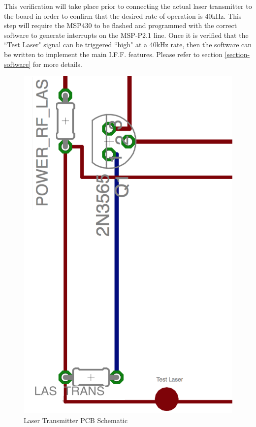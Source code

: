 \documentclass[letterpaper,10pt]{article}
\begin{document}
\begin{spacing}{1.15}
This verification will take place prior to connecting the actual laser transmitter to the board in order to confirm that the desired rate of operation is 40kHz. This step will require the MSP430 to be flashed and programmed with the correct software to generate interrupts on the MSP-P2.1 line. Once it is verified that the ``Test Laser" signal can be triggered ``high" at a 40kHz rate, then the software can be written to implement the main I.F.F. features. Please refer to section \ref{section-software} for more details.
\begin{figure} [H]
	\centering
	\includegraphics[scale=0.4]{transmitter-pcb.png}
	\caption{Laser Transmitter PCB Schematic\label{fig:laser-pcb}}
\end{figure}


\end{spacing}
\end{document}
